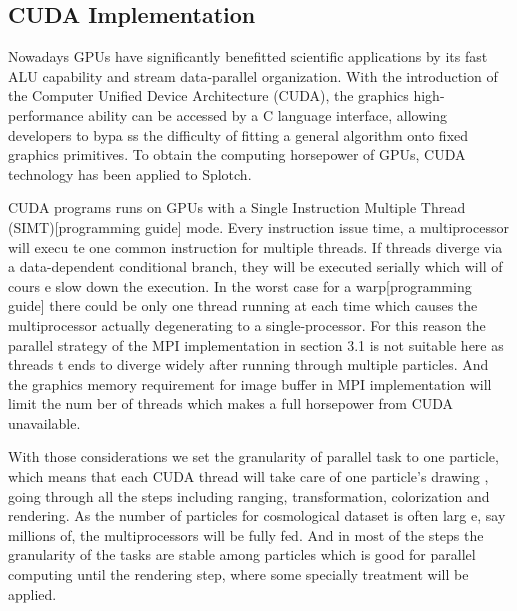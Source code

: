 \subsection{CUDA Implementation}
\label{cuda}
Nowadays GPUs have significantly benefitted scientific applications by its fast ALU 
capability and stream data-parallel organization. With the introduction of
 the Computer Unified Device Architecture (CUDA), the graphics high-performance 
 ability can be accessed by a C language interface, allowing developers to bypa
ss the difficulty of fitting a general algorithm onto fixed graphics primitives. 
To obtain the computing horsepower of GPUs, CUDA technology has been applied
to Splotch.

CUDA programs runs on GPUs with a Single Instruction Multiple Thread (SIMT)[programming guide] 
mode. Every instruction issue time, a multiprocessor will execu
te one common instruction for multiple threads. If threads diverge via a data-dependent 
conditional branch, they will be executed serially which will of cours
e slow down the execution. In the worst case for a warp[programming guide] there could 
be only one thread running at each time which causes the multiprocessor
 actually degenerating to a single-processor. For this reason the parallel strategy of 
 the MPI implementation in section 3.1 is not suitable here as threads t
ends to diverge widely after running through multiple particles. And the graphics memory 
requirement for image buffer in MPI implementation will limit the num
ber of threads which makes a full horsepower from CUDA unavailable.

With those considerations we set the granularity of parallel task to one particle, which 
means that each CUDA thread will take care of one particle's drawing
, going through all the steps including ranging, transformation, colorization and 
rendering. As the number of particles for cosmological dataset is often larg
e, say millions of, the multiprocessors will be fully fed. And in most of the steps the 
granularity of the tasks are stable among particles which is good for
parallel computing until the rendering step, where some specially treatment will be applied.

